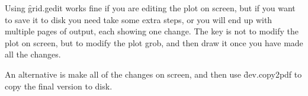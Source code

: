 Using \f{grid.gedit} works fine if you are editing the plot on screen, but if you want to save it to disk you need take some extra steps, or you will end up with multiple pages of output, each showing one change.  The key is not to modify the plot on screen, but to modify the plot grob, and then draw it once you have made all the changes.  

% 
% 


An alternative is make all of the changes on screen, and then use \f{dev.copy2pdf} to copy the final version to disk.


